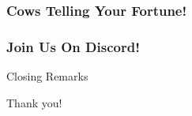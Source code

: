 \documentclass{beamer}
\begin{document}
\begin{frame}[fragile]
	\frametitle{Cows Telling Your Fortune!}
	\vfill
\end{frame}

\begin{frame}[fragile]
	\frametitle{Join Us On Discord!}
	\vfill
\end{frame}

\begin{frame}{Closing Remarks}
	\begin{center}
		\Huge Thank you!
	\end{center}
\end{frame}
\end{document}

